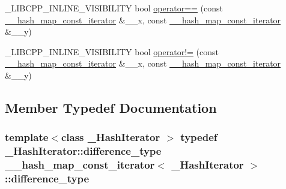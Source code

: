 \begin{DoxyCompactItemize}
\+\_\+\+L\+I\+B\+C\+P\+P\+\_\+\+I\+N\+L\+I\+N\+E\+\_\+\+V\+I\+S\+I\+B\+I\+L\+I\+T\+Y bool \hyperlink{class____hash__map__const__iterator_ac410df59b0d1c7793a6eb6db1b8e044e}{operator==} (const \hyperlink{class____hash__map__const__iterator}{\+\_\+\+\_\+hash\+\_\+map\+\_\+const\+\_\+iterator} \&\+\_\+\+\_\+x, const \hyperlink{class____hash__map__const__iterator}{\+\_\+\+\_\+hash\+\_\+map\+\_\+const\+\_\+iterator} \&\+\_\+\+\_\+y)
\item 
\+\_\+\+L\+I\+B\+C\+P\+P\+\_\+\+I\+N\+L\+I\+N\+E\+\_\+\+V\+I\+S\+I\+B\+I\+L\+I\+T\+Y bool \hyperlink{class____hash__map__const__iterator_a28b0a851d8dca47ffcdd8f936ba9d780}{operator!=} (const \hyperlink{class____hash__map__const__iterator}{\+\_\+\+\_\+hash\+\_\+map\+\_\+const\+\_\+iterator} \&\+\_\+\+\_\+x, const \hyperlink{class____hash__map__const__iterator}{\+\_\+\+\_\+hash\+\_\+map\+\_\+const\+\_\+iterator} \&\+\_\+\+\_\+y)
\end{DoxyCompactItemize}


\subsection{Member Typedef Documentation}
\hypertarget{class____hash__map__const__iterator_abb62a6764e9e5be48b0704166bbb7aa0}{}
\subsubsection[{difference\+\_\+type}]{\setlength{\rightskip}{0pt plus 5cm}template$<$class \+\_\+\+Hash\+Iterator $>$ typedef \+\_\+\+Hash\+Iterator\+::difference\+\_\+type {\bf \+\_\+\+\_\+hash\+\_\+map\+\_\+const\+\_\+iterator}$<$ \+\_\+\+Hash\+Iterator $>$\+::{\bf difference\+\_\+type}}\label{class____hash__map__const__iterator_abb62a6764e9e5be48b0704166bbb7aa0}
\hypertarget{class____hash__map__const__iterator_abb62a6764e9e5be48b0704166bbb7aa0}{}
